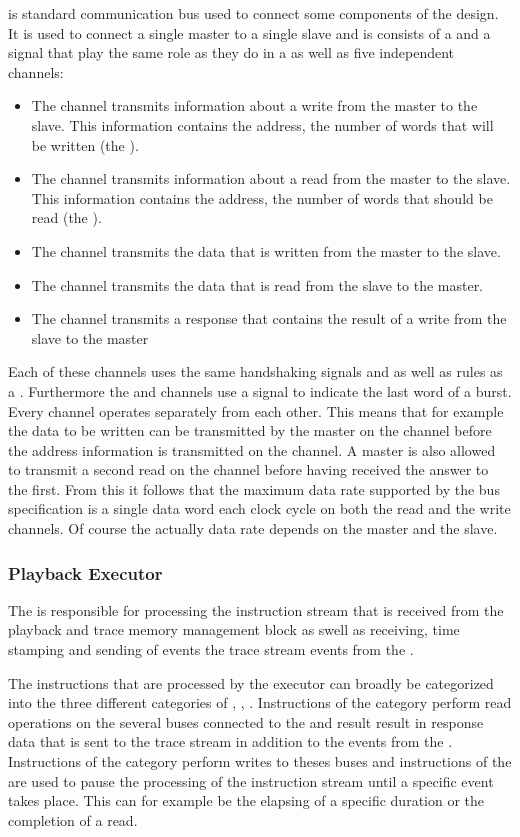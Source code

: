 \AXI{}\autocite{ref:axi} is standard communication bus used to connect some components of the \FPGA{} design. It is used to connect a single master to a single slave and is consists of a \ACLK{} and a \ARESETn{} signal that play the same role as they do in a \AXIStream{} as well as five independent channels:
\begin{itemize}
  \item The \AW{} channel transmits information about a write from the master to the slave. This information contains the address, the number of words that will be written (the \burstsize{}).
  \item The \AR{} channel transmits information about a read from the master to the slave. This information contains the address, the number of words that should be read (the \burstsize{}).
  \item The \W{} channel transmits the data that is written from the master to the slave.
  \item The \R{} channel transmits the data that is read from the slave to the master.
  \item The \B{} channel transmits a response that contains the result of a write from the slave to the master
\end{itemize}
Each of these channels uses the same handshaking signals \READY{} and \VALID{} as well as rules as a \AXIStream{}. Furthermore the \W{} and \R{} channels use a \LAST{} signal to indicate the last word of a burst.
Every channel operates separately from each other. This means that for example the data to be written can be transmitted by the master on the \W{} channel before the address information is transmitted on the \AW{} channel. A master is also allowed to transmit a second read on the \AR{} channel before having received the answer to the first.
From this it follows that the maximum data rate supported by the bus specification is a single data word each clock cycle on both the read and the write channels. Of course the actually data rate depends on the master and the slave.


\subsubsection{Playback Executor}
The \pbexec{} is responsible for processing the instruction stream that is received from the playback and trace memory management block as swell as receiving, time stamping and sending of events the trace stream events from the \ASIC{}.

The instructions that are processed by the executor can broadly be categorized into the three different categories of \readCat{}, \writeCat{}, \waitCat{}. Instructions of the \readCat{} category perform read operations on the several buses connected to the \pbexec{} and result result in response data that is sent to the trace stream in addition to the events from the \ASIC{}. Instructions of the \writeCat{} category perform writes to theses buses and instructions of the \waitCat{} are used to pause the processing of the instruction stream until a specific event takes place. This can for example be the elapsing of a specific duration or the completion of a read.

